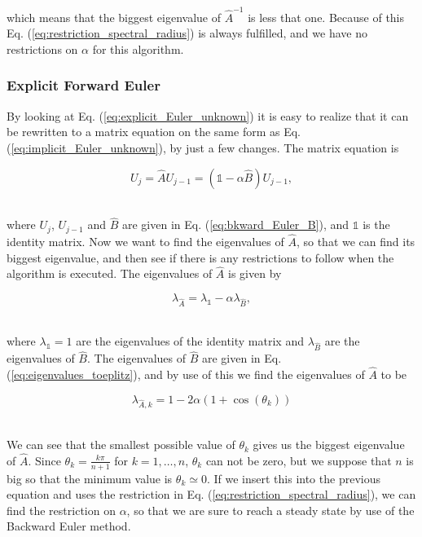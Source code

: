 \documentclass[12pt]{article}
\begin{document}
\begin{flushleft}
which means that the biggest eigenvalue of $\hat{A}^{-1}$ is less that one. Because of this Eq. (\ref{eq:restriction_spectral_radius}) is always fulfilled, and we have no restrictions on $\alpha$ for this algorithm.

\subsubsection{Explicit Forward Euler\label{sect:eigvals_forwrd_Euler}}
By looking at Eq. (\ref{eq:explicit_Euler_unknown}) it is easy to realize that it can be rewritten to a matrix equation on the same form as Eq. (\ref{eq:implicit_Euler_unknown}), by just a few changes. The matrix equation is

\vspace{5mm}
$$U_{j} = \hat{A}U_{j-1} = (\mathbb{1} - \alpha\hat{B})U_{j-1},$$\\ 
\vspace{5mm}

where $U_{j}$, $U_{j-1}$ and $\hat{B}$ are given in Eq. (\ref{eq:bkward_Euler_B}), and $\mathbb{1}$ is the identity matrix. Now we want to find the eigenvalues of $\hat{A}$, so that we can find its biggest eigenvalue, and then see if there is any restrictions to follow when the algorithm is executed. The eigenvalues of $\hat{A}$ is given by

\vspace{5mm}
$$\lambda_{\hat{A}} = \lambda_{\mathbb{1}} - \alpha\lambda_{\hat{B}},$$\\
\vspace{5mm}

where $\lambda_{\mathbb{1}} = 1$ are the eigenvalues of the identity matrix and $\lambda_{\hat{B}}$ are the eigenvalues of $\hat{B}$. The eigenvalues of $\hat{B}$ are given in Eq. (\ref{eq:eigenvalues_toeplitz}), and by use of this we find the eigenvalues of $\hat{A}$ to be

\vspace{5mm}
$$\lambda_{\hat{A},k} = 1-2\alpha(1+\cos(\theta_k))$$\\
\vspace{5mm}

We can see that the smallest possible value of $\theta_k$ gives us the biggest eigenvalue of $\hat{A}$. Since $\theta_k = \frac{k\pi}{n+1}$ for $k=1,\dots ,n$, $\theta_k$ can not be zero, but we suppose that $n$ is big so that the minimum value is $\theta_k \simeq 0$. If we insert this into the previous equation and uses the restriction in Eq. (\ref{eq:restriction_spectral_radius}), we can find the restriction on $\alpha$, so that we are sure to reach a steady state by use of the Backward Euler method.


\end{flushleft}
\end{document}
